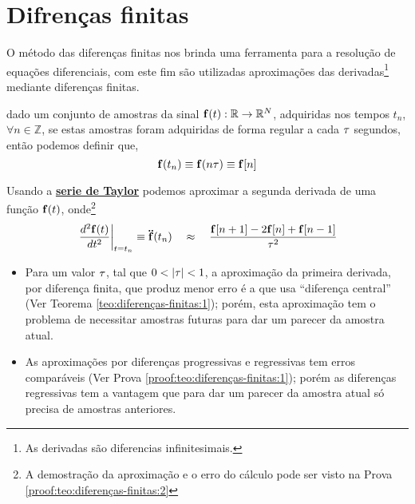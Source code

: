 \section{Difrenças finitas}

O método das diferenças finitas nos brinda uma ferramenta para a resolução de 
equações diferenciais, com este fim são utilizadas aproximações das derivadas\footnote{As 
derivadas são diferencias infinitesimais.} 
mediante diferenças finitas.

\begin{definition}
\label{def:diferenças-finitas:0}
dado um conjunto de amostras da sinal $\VECTOR{f}(t): \mathbb{R} \rightarrow \mathbb{R}^N$, 
adquiridas nos  tempos $t_n$, $\forall n \in \mathbb{Z}$, 
se estas amostras foram adquiridas de forma regular a cada $\tau$ segundos,
então podemos definir que,
\begin{equation}
\VECTOR{f}(t_n)\equiv \VECTOR{f}(n\tau) \equiv \VECTOR{f}[n]
\end{equation}
\end{definition}

\begin{theorem}
\label{teo:diferenças-finitas:2}
Usando a \hyperref[def:taylor]{\textbf{serie de Taylor}} podemos aproximar 
a segunda derivada de uma função $\VECTOR{f}(t)$, onde\footnote{A
demostração da aproximação e o erro do cálculo pode ser visto na Prova \ref{proof:teo:diferenças-finitas:2}}
\begin{equation}
\left.\frac{d^2\VECTOR{f}(t)}{dt^2}\right|_{t=t_n}\equiv \DDTVECTOR{f}(t_n)
\quad \approx \quad
\frac{\VECTOR{f}[n+1]-2\VECTOR{f}[n]+\VECTOR{f}[n-1]}{\ToS^2}  
\end{equation}
\end{theorem}

\begin{tcbattention}
\begin{itemize}
\item Para um valor $\tau$, tal que $0<|\ToS|<1$, a aproximação da primeira derivada, por diferença finita, 
que produz menor erro é a que usa ``diferença central'' (Ver Teorema \ref{teo:diferenças-finitas:1}); porém, 
esta aproximação tem o problema de necessitar amostras futuras para dar um parecer da amostra atual.
\item As aproximações por diferenças progressivas e regressivas tem erros comparáveis
 (Ver Prova \ref{proof:teo:diferenças-finitas:1});
porém as diferenças regressivas tem a vantagem que para dar um parecer da amostra atual só precisa de amostras anteriores.
\end{itemize}
\end{tcbattention}


